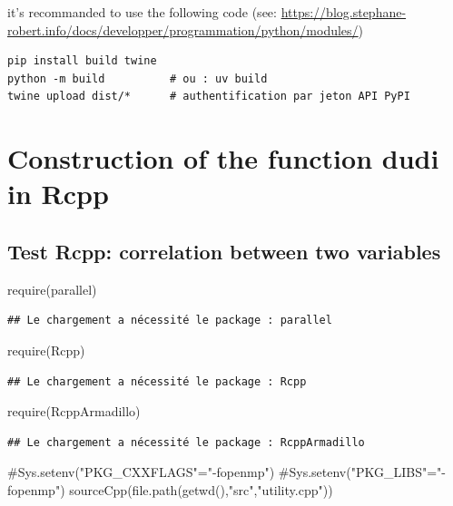 \documentclass[
  10pt,
]{article}
\newenvironment{Shaded}{\begin{snugshade}}{\end{snugshade}}
\newcommand{\NormalTok}[1]{#1}
\begin{document}
it's recommanded to use the following code (see:
\url{https://blog.stephane-robert.info/docs/developper/programmation/python/modules/})

\begin{verbatim}
pip install build twine
python -m build          # ou : uv build
twine upload dist/*      # authentification par jeton API PyPI
\end{verbatim}

\section{Construction of the function dudi in
Rcpp}\label{construction-of-the-function-dudi-in-rcpp}

\subsection{Test Rcpp: correlation between two
variables}\label{test-rcpp-correlation-between-two-variables}

\begin{Shaded}
\begin{Highlighting}[]
\NormalTok{require(parallel)}
\end{Highlighting}
\end{Shaded}

\begin{verbatim}
## Le chargement a nécessité le package : parallel
\end{verbatim}

\begin{Shaded}
\begin{Highlighting}[]
\NormalTok{require(Rcpp)}
\end{Highlighting}
\end{Shaded}

\begin{verbatim}
## Le chargement a nécessité le package : Rcpp
\end{verbatim}

\begin{Shaded}
\begin{Highlighting}[]
\NormalTok{require(RcppArmadillo)}
\end{Highlighting}
\end{Shaded}

\begin{verbatim}
## Le chargement a nécessité le package : RcppArmadillo
\end{verbatim}

\begin{Shaded}
\begin{Highlighting}[]
\NormalTok{\#Sys.setenv("PKG\_CXXFLAGS"="{-}fopenmp")}
\NormalTok{\#Sys.setenv("PKG\_LIBS"="{-}fopenmp")}
\NormalTok{sourceCpp(file.path(getwd(),"src","utility.cpp"))}
\end{Highlighting}
\end{Shaded}
\end{document}
